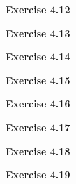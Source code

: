 \documentclass{article}
\begin{document}
\bigskip

\begin{framed}
    \noindent \textbf{Exercise 4.12}
    
    \medskip
    
    
\end{framed}


\bigskip

\begin{framed}
    \noindent \textbf{Exercise 4.13}
    
    \medskip
    
    
\end{framed}


\bigskip

\begin{framed}
    \noindent \textbf{Exercise 4.14}
    
    \medskip
    
    
\end{framed}


\bigskip

\begin{framed}
    \noindent \textbf{Exercise 4.15}
    
    \medskip
    
    
\end{framed}


\bigskip

\begin{framed}
    \noindent \textbf{Exercise 4.16}
    
    \medskip
    
    
\end{framed}


\bigskip

\begin{framed}
    \noindent \textbf{Exercise 4.17}
    
    \medskip
    
    
\end{framed}


\bigskip

\begin{framed}
    \noindent \textbf{Exercise 4.18}
    
    \medskip
    
    
\end{framed}


\bigskip

\begin{framed}
    \noindent \textbf{Exercise 4.19}
    
    \medskip
    
    
\end{framed}
\end{document}
